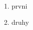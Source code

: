 \documentclass{article}
\begin{document}
\begin{enumerate}
    \item prvni
    \item druhy
\end{enumerate}
\end{document}
